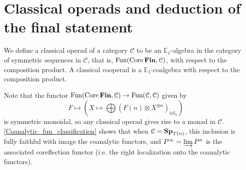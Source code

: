 \section{Classical operads and deduction of the final statement}

	\begin{defn}\label{Classical_operad}
		We define a classical operad of a category $\mathcal{C}$ to be an $\mathbb{E}_1$-algebra in the category of symmetric sequences in $\mathcal{C}$, that is, $\operatorname{\mathrm{Fun}}(\operatorname{\mathrm{Core}}\mathbf{Fin},\mathcal{C})$, with respect to the composition product. A classical cooperad is a $\mathbb{E}_1$-coalgebra with respect to the composition product. 
	\end{defn}

	\begin{const}\label{Tel_loc_monad_op}
		Note that the functor $\operatorname{\mathrm{Fun}}(\operatorname{\mathrm{Core}}\mathbf{Fin},\mathcal{C})\to\operatorname{\mathrm{Fun}}(\mathcal{C},\mathcal{C})$ given by 
		\[ F\mapsto (X\mapsto\bigoplus(F(n)\otimes X^{\otimes n})_{hS_n}) \]
		is symmetric monoidal, so any classical operad gives rise to a monad in $\mathcal{C}$. \cref{Coanalytic_fun_classification} shows that when $\mathcal{C}=\mathbf{Sp}_{T(n)}$, this inclusion is fully faithful with image the coanalytic functors, and $P^\infty=\varinjlim P^n$ is the associated coreflection functor (i.e. the right localization onto the coanalytic functors). 
	\end{const}

